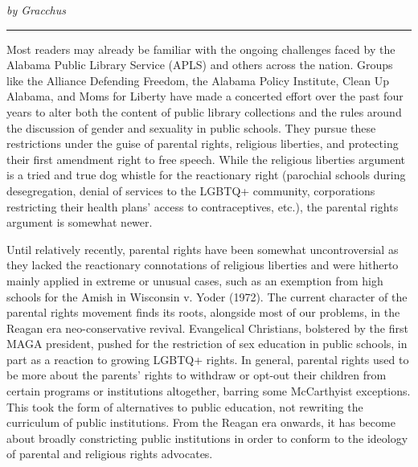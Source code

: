 \documentclass[
]{book}
\begin{document}
\emph{by Gracchus}

\begin{center}\rule{0.5\linewidth}{0.5pt}\end{center}

Most readers may already be familiar with the ongoing challenges faced by the Alabama Public Library Service (APLS) and others across the nation. Groups like the Alliance Defending Freedom, the Alabama Policy Institute, Clean Up Alabama, and Moms for Liberty have made a concerted effort over the past four years to alter both the content of public library collections and the rules around the discussion of gender and sexuality in public schools. They pursue these restrictions under the guise of parental rights, religious liberties, and protecting their first amendment right to free speech. While the religious liberties argument is a tried and true dog whistle for the reactionary right (parochial schools during desegregation, denial of services to the LGBTQ+ community, corporations restricting their health plans' access to contraceptives, etc.), the parental rights argument is somewhat newer.

Until relatively recently, parental rights have been somewhat uncontroversial as they lacked the reactionary connotations of religious liberties and were hitherto mainly applied in extreme or unusual cases, such as an exemption from high schools for the Amish in Wisconsin v. Yoder (1972). The current character of the parental rights movement finds its roots, alongside most of our problems, in the Reagan era neo-conservative revival. Evangelical Christians, bolstered by the first MAGA president, pushed for the restriction of sex education in public schools, in part as a reaction to growing LGBTQ+ rights. In general, parental rights used to be more about the parents' rights to withdraw or opt-out their children from certain programs or institutions altogether, barring some McCarthyist exceptions. This took the form of alternatives to public education, not rewriting the curriculum of public institutions. From the Reagan era onwards, it has become about broadly constricting public institutions in order to conform to the ideology of parental and religious rights advocates.
\end{document}

